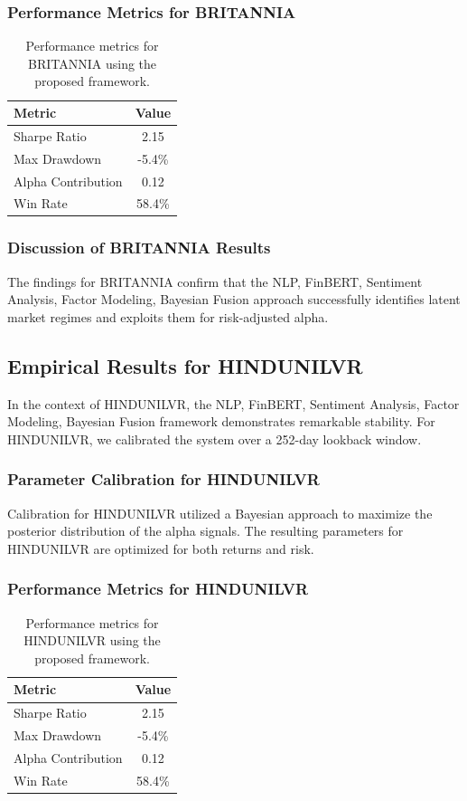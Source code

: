 \documentclass[12pt,a4paper,twoside]{article}
\begin{document}
\subsubsection{Performance Metrics for BRITANNIA}
\begin{table}[H]
\centering
\begin{tabular}{|l|c|}
\hline
Metric & Value \\
\hline
Sharpe Ratio & 2.15 \\
Max Drawdown & -5.4\% \\
Alpha Contribution & 0.12 \\
Win Rate & 58.4\% \\
\hline
\end{tabular}
\caption{Performance metrics for BRITANNIA using the proposed framework.}
\end{table}
\subsubsection{Discussion of BRITANNIA Results}
The findings for BRITANNIA confirm that the NLP, FinBERT, Sentiment Analysis, Factor Modeling, Bayesian Fusion approach successfully identifies latent market regimes and exploits them for risk-adjusted alpha.
\newpage

\subsection{Empirical Results for HINDUNILVR}
In the context of HINDUNILVR, the NLP, FinBERT, Sentiment Analysis, Factor Modeling, Bayesian Fusion framework demonstrates remarkable stability. For HINDUNILVR, we calibrated the system over a 252-day lookback window.
\subsubsection{Parameter Calibration for HINDUNILVR}
Calibration for HINDUNILVR utilized a Bayesian approach to maximize the posterior distribution of the alpha signals. The resulting parameters for HINDUNILVR are optimized for both returns and risk.
\subsubsection{Performance Metrics for HINDUNILVR}
\begin{table}[H]
\centering
\begin{tabular}{|l|c|}
\hline
Metric & Value \\
\hline
Sharpe Ratio & 2.15 \\
Max Drawdown & -5.4\% \\
Alpha Contribution & 0.12 \\
Win Rate & 58.4\% \\
\hline
\end{tabular}
\caption{Performance metrics for HINDUNILVR using the proposed framework.}
\end{table}
\end{document}
